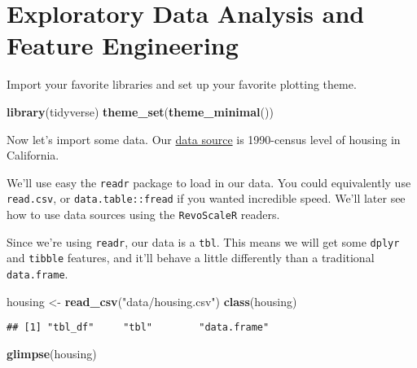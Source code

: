 \documentclass[]{book}
\newenvironment{Shaded}{\begin{snugshade}}{\end{snugshade}}
\newcommand{\KeywordTok}[1]{\textcolor[rgb]{0.13,0.29,0.53}{\textbf{#1}}}
\newcommand{\StringTok}[1]{\textcolor[rgb]{0.31,0.60,0.02}{#1}}
\newcommand{\NormalTok}[1]{#1}
\theoremstyle{definition}
\theoremstyle{definition}
\theoremstyle{definition}
\theoremstyle{remark}
\begin{document}
\chapter{Exploratory Data Analysis and Feature
Engineering}\label{exploratory-data-analysis-and-feature-engineering}

Import your favorite libraries and set up your favorite plotting theme.

\begin{Shaded}
\begin{Highlighting}[]
\KeywordTok{library}\NormalTok{(tidyverse)}
\KeywordTok{theme_set}\NormalTok{(}\KeywordTok{theme_minimal}\NormalTok{())}
\end{Highlighting}
\end{Shaded}

Now let's import some data. Our
\href{http://www.dcc.fc.up.pt/~ltorgo/Regression/cal_housing.html}{data
source} is 1990-census level of housing in California.

We'll use easy the \texttt{readr} package to load in our data. You could
equivalently use \texttt{read.csv}, or \texttt{data.table::fread} if you
wanted incredible speed. We'll later see how to use data sources using
the \texttt{RevoScaleR} readers.

Since we're using \texttt{readr}, our data is a \texttt{tbl}. This means
we will get some \texttt{dplyr} and \texttt{tibble} features, and it'll
behave a little differently than a traditional \texttt{data.frame}.

\begin{Shaded}
\begin{Highlighting}[]
\NormalTok{housing <-}\StringTok{ }\KeywordTok{read_csv}\NormalTok{(}\StringTok{"data/housing.csv"}\NormalTok{)}
\KeywordTok{class}\NormalTok{(housing)}
\end{Highlighting}
\end{Shaded}

\begin{verbatim}
## [1] "tbl_df"     "tbl"        "data.frame"
\end{verbatim}

\begin{Shaded}
\begin{Highlighting}[]
\KeywordTok{glimpse}\NormalTok{(housing)}
\end{Highlighting}
\end{Shaded}
\end{document}
